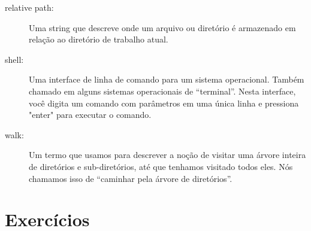 \begin{description}
\item[relative path:] Uma string que descreve onde um arquivo ou
diretório é armazenado em relação ao diretório de trabalho atual.

\item[shell:] Uma interface de linha de comando para um sistema operacional.
Também chamado em alguns sistemas operacionais de ``terminal''.
Nesta interface, você digita um comando com parâmetros em uma única linha e pressiona "enter" 
para executar o comando.

\item[walk:] Um termo que usamos para descrever a noção de visitar
uma árvore inteira de diretórios e sub-diretórios, até que tenhamos
visitado todos eles. Nós chamamos isso de ``caminhar pela árvore de diretórios''.

\end{description}

\section{Exercícios}


